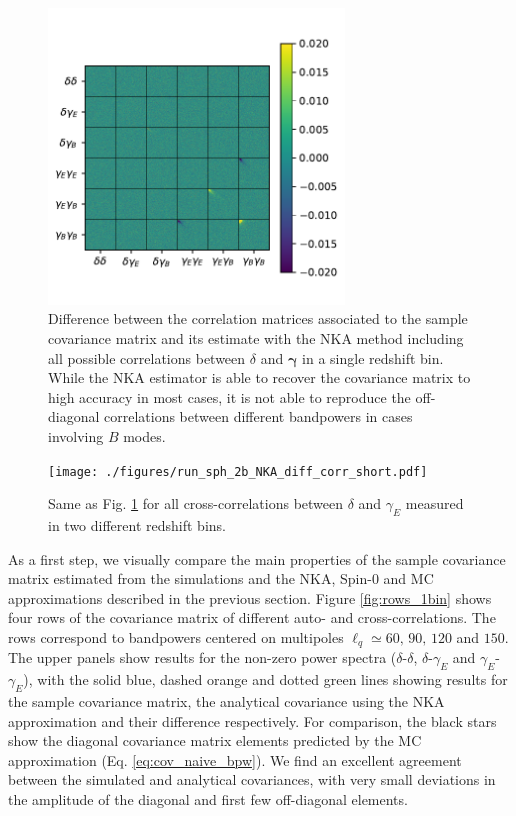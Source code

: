 \documentclass[a4paper,11pt]{article}
\begin{document}
      \begin{figure}
        \centering
        \includegraphics[width=0.7\textwidth]{./figures/sph_1bin_diff_corr.pdf}
        \caption{Difference between the correlation matrices associated to the sample covariance matrix and its estimate with the NKA method including all possible correlations between $\delta$ and $\boldsymbol{\gamma}$ in a single redshift bin. While the NKA estimator is able to recover the covariance matrix to high accuracy in most cases, it is not able to reproduce the off-diagonal correlations between different bandpowers in cases involving $B$ modes.} \label{fig:diff_corr_1bin}
      \end{figure}
      \begin{figure}
        \centering
        \texttt{[image: ./figures/run\_sph\_2b\_NKA\_diff\_corr\_short.pdf]}
        \caption{Same as Fig. \ref{fig:diff_corr_1bin} for all cross-correlations between $\delta$ and $\gamma_E$ measured in two different redshift bins.}
        \label{fig:corr_diff_2bins}
      \end{figure}
      As a first step, we visually compare the main properties of the sample covariance matrix estimated from the simulations and the NKA, Spin-0 and MC approximations described in the previous section. Figure \ref{fig:rows_1bin} shows four rows of the covariance matrix of different auto- and cross-correlations. The rows correspond to bandpowers centered on multipoles $\ell_q\simeq60,\,90,\,120$ and $150$. The upper panels show results for the non-zero power spectra ($\delta$-$\delta$, $\delta$-$\gamma_E$ and $\gamma_E$-$\gamma_E$), with the solid blue, dashed orange and dotted green lines showing results for the sample covariance matrix, the analytical covariance using the NKA approximation and their difference respectively. For comparison, the black stars show the diagonal covariance matrix elements predicted by the MC approximation (Eq. \ref{eq:cov_naive_bpw}). We find an excellent agreement between the simulated and analytical covariances, with very small deviations in the amplitude of the diagonal and first few off-diagonal elements.
      
\end{document}
